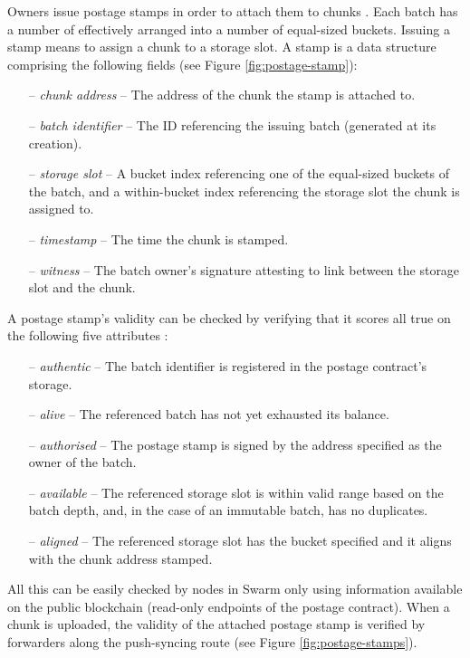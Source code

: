 Owners issue postage stamps in order to attach them to chunks%
. Each batch has a number of  effectively arranged into a number of equal-sized buckets. Issuing a stamp means to assign a chunk to a storage slot. A stamp is a data structure comprising the following fields (see Figure  \ref{fig:postage-stamp}):

\begin{itemize}[noitemsep]
    \item[--] \emph{chunk address} -- The address of the chunk the stamp is attached to. 
    \item[--] \emph{batch identifier} --  The ID referencing the issuing batch (generated at its creation).
    \item[--] \emph{storage slot} -- A bucket index referencing one of the equal-sized buckets of the batch, and a within-bucket index referencing the storage slot the chunk is assigned to.
    \item[--] \emph{timestamp} -- The time the chunk is stamped. 
    \item[--] \emph{witness} -- The batch owner's signature attesting to link between the storage slot and the chunk.
\end{itemize}

A postage stamp's validity can be checked by verifying that it scores all true on the following five attributes%
:

\begin{itemize}[noitemsep]
\item[--] \emph{authentic} -- The batch identifier is registered in the postage contract's storage.
\item[--] \emph{alive} -- The referenced batch has not yet exhausted its balance.
\item[--] \emph{authorised} -- The postage stamp is signed by the address specified as the owner of the batch. 
\item[--] \emph{available} -- The referenced storage slot is within valid range based on the batch depth, and, in the case of an immutable batch, has no duplicates.
\item[--] \emph{aligned} -- The referenced storage slot has the bucket specified and it aligns with the chunk address stamped.
\end{itemize}

All this can be easily checked by nodes in Swarm only using information available on the public blockchain (read-only endpoints of the postage contract). When a chunk is uploaded, the validity of the attached postage stamp is verified by forwarders along the push-syncing route  (see Figure \ref{fig:postage-stamps}).


